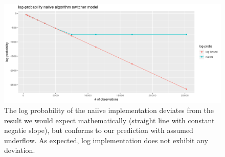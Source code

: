 \begin{figure}
	\includegraphics[width=\linewidth]{./img/superiority_log_approach.png}
	\caption{The log probability of the naiive implementation deviates from the result we would expect mathematically (straight line with constant negatie slope), but conforms to our prediction with assumed underflow. As expected, log implementation does not exhibit any deviation.}
	\label{log_impl_no_more_underflow}
\end{figure}


















